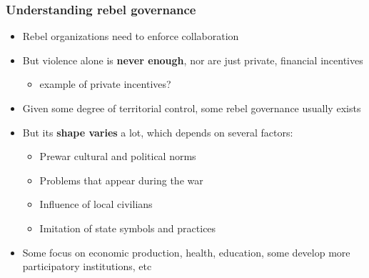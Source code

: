 \documentclass[aspectratio=43]{beamer}
\begin{document}
\begin{frame}
\frametitle{Understanding rebel governance}
\centering

\begin{itemize}[<+->]
  \item Rebel organizations need to enforce collaboration
  \item But violence alone is \textbf{never enough}, nor are just private, financial incentives
  \begin{itemize}
    \item example of private incentives?
  \end{itemize}
  \item Given some degree of territorial control, some rebel governance usually exists
  \item But its \textbf{shape varies} a lot, which depends on several factors:
  \begin{itemize}
    \item Prewar cultural and political norms
    \item Problems that appear during the war
    \item Influence of local civilians
    \item Imitation of state symbols and practices
  \end{itemize}
  \item Some focus on economic production, health, education, some develop more participatory institutions, etc
\end{itemize}

\end{frame}
\end{document}
